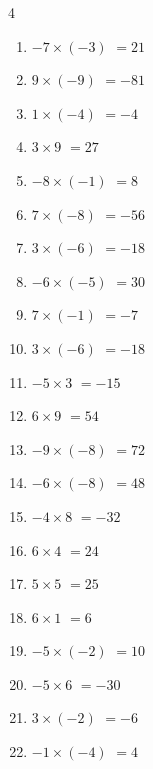 \begin{multicols}{4}
\begin{enumerate}
  \item $-7\times (-3)$
        $=21$

  \item $9\times (-9)$
        $=-81$

  \item $1\times (-4)$
        $=-4$

  \item $3\times 9$
        $=27$

  \item $-8\times (-1)$
        $=8$

  \item $7\times (-8)$
        $=-56$

  \item $3\times (-6)$
        $=-18$

  \item $-6\times (-5)$
        $=30$

  \item $7\times (-1)$
        $=-7$

  \item $3\times (-6)$
        $=-18$

  \item $-5\times 3$
        $=-15$

  \item $6\times 9$
        $=54$

  \item $-9\times (-8)$
        $=72$

  \item $-6\times (-8)$
        $=48$

  \item $-4\times 8$
        $=-32$

  \item $6\times 4$
        $=24$

  \item $5\times 5$
        $=25$

  \item $6\times 1$
        $=6$

  \item $-5\times (-2)$
        $=10$

\columnbreak %

  \item $-5\times 6$
        $=-30$

  \item $3\times (-2)$
        $=-6$

  \item $-1\times (-4)$
        $=4$


\end{enumerate}
\end{multicols}
